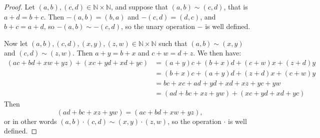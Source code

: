 \documentclass{article}
\newcommand{\N}{\mathbb{N}}
\begin{document}
\begin{proof}
	Let $(a, b), (c, d) \in \N \times \N$, and suppose that $(a,b) \sim (c,d)$, that is $a + d = b + c$. Then $-(a,b) = (b,a)$ and $-(c,d) = (d,c)$, and $b + c = a + d$, so $-(a,b) \sim -(c,d)$, so the unary operation $-$ is well defined.

	Now let $(a, b), (c, d), (x, y), (z, w) \in \N \times \N$ such that $(a, b) \sim (x, y)$ and $(c, d) \sim (z, w)$. Then $a + y = b + x$ and $c + w = d + z$. We then have:
	\begin{align*}
		(ac + bd + xw + yz) + (xc + yd + xd + yc) &= (a + y)c + (b + x)d + (c + w)x + (z + d)y \\&= (b + x)c + (a + y)d + (z + d)x + (c + w)y \\&= bc + xc + ad + yd + xd + xz + yc + yw \\&= (ad + bc + xz + yw) + (xc + yd + xd + yc)
	\end{align*}
	Then \[ (ad + bc + xz + yw) = (ac + bd + xw + yz), \] or in other words $(a, b) \cdot (c, d) \sim (x, y) \cdot (z, w)$, so the operation $\cdot$ is well defined.
\end{proof}
\end{document}
